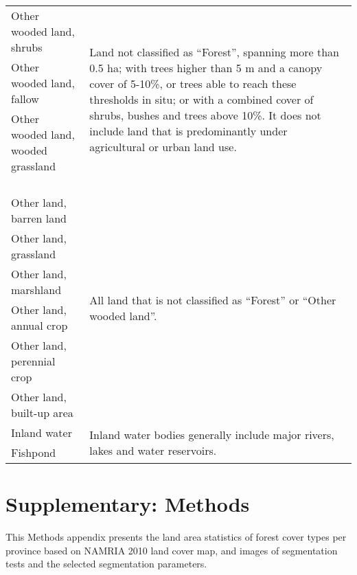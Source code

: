 \begin{appendices}
\begin{spacing}{1.0}
\begin{longtable}[h!]{ p{6cm} p{8cm} }
    \cmidrule{1-2}
    
    Other wooded land, shrubs & \multirow{7}{8cm}[0cm]{Land not classified as \enquote{Forest}, spanning more than 0.5 ha; with trees higher than 5 m and a canopy cover of 5-10\%, or trees able to reach these thresholds in situ; or with a combined cover of shrubs, bushes and trees above 10\%. It does not include land that is predominantly under agricultural or urban land use.}\\
    Other wooded land, fallow & {}\\
    Other wooded land, wooded grassland & {}\\
    {} & {}\\
    {} & {}\\
    {} & {}\\
    {} & {}\\[3pt]
    
    \cmidrule{1-2}
	
	Other land, barren land & \multirow{6}{8cm}[1cm]{All land that is not classified as \enquote{Forest} or \enquote{Other wooded land}.}\\
    Other land, grassland & {}\\
    Other land, marshland & {}\\
    Other land, annual crop & {}\\
    Other land, perennial crop & {}\\
    Other land, built-up area & {}\\[3pt]
    
    \cmidrule{1-2}
    
    Inland water & \multirow{2}{8cm}{Inland water bodies generally include major rivers, lakes and water reservoirs.}\\
    Fishpond & {}\\

	
    \bottomrule
\end{longtable}
\end{spacing}

\chapter{Supplementary: Methods}
\label{sup: supplementary-methods}

This Methods appendix presents the land area statistics of forest cover types per province based on NAMRIA 2010 land cover map, and images of segmentation tests and the selected segmentation parameters.



\end{appendices}
